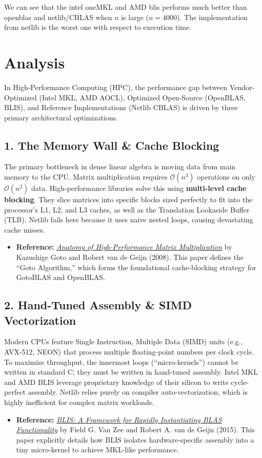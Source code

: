 \documentclass[12pt]{article}
\theoremstyle{definition}
\theoremstyle{remark}
\begin{document}
We can see that the intel oneMKL and AMD blis performs much better than openblas and netlib/CBLAS when $n$ is large ($n=4000$). The implementation from netlib is the worst one with respect to execution time.
\section{Analysis}
In High-Performance Computing (HPC), the performance gap between Vendor-Optimized (Intel MKL, AMD AOCL), Optimized Open-Source (OpenBLAS, BLIS), and Reference Implementations (Netlib CBLAS) is driven by three primary architectural optimizations.

\subsection*{1. The Memory Wall \& Cache Blocking}
The primary bottleneck in dense linear algebra is moving data from main memory to the CPU. Matrix multiplication requires $\mathcal{O}(n^3)$ operations on only $\mathcal{O}(n^2)$ data. High-performance libraries solve this using \textbf{multi-level cache blocking}. They slice matrices into specific blocks sized perfectly to fit into the processor's L1, L2, and L3 caches, as well as the Translation Lookaside Buffer (TLB). Netlib fails here because it uses naive nested loops, causing devastating cache misses.
\begin{itemize}[noitemsep, topsep=2pt]
    \item \textbf{Reference:} \href{https://doi.org/10.1145/1356052.1356053}{\textit{Anatomy of High-Performance Matrix Multiplication}} by Kazushige Goto and Robert van de Geijn (2008). This paper defines the ``Goto Algorithm,'' which forms the foundational cache-blocking strategy for GotoBLAS and OpenBLAS.
\end{itemize}

\subsection*{2. Hand-Tuned Assembly \& SIMD Vectorization}
Modern CPUs feature Single Instruction, Multiple Data (SIMD) units (e.g., AVX-512, NEON) that process multiple floating-point numbers per clock cycle. To maximize throughput, the innermost loops (``micro-kernels'') cannot be written in standard C; they must be written in hand-tuned assembly. Intel MKL and AMD BLIS leverage proprietary knowledge of their silicon to write cycle-perfect assembly. Netlib relies purely on compiler auto-vectorization, which is highly inefficient for complex matrix workloads.
\begin{itemize}[noitemsep, topsep=2pt]
    \item \textbf{Reference:} \href{https://doi.org/10.1145/2764454}{\textit{BLIS: A Framework for Rapidly Instantiating BLAS Functionality}} by Field G. Van Zee and Robert A. van de Geijn (2015). This paper explicitly details how BLIS isolates hardware-specific assembly into a tiny micro-kernel to achieve MKL-like performance.
\end{itemize}
\end{document}
